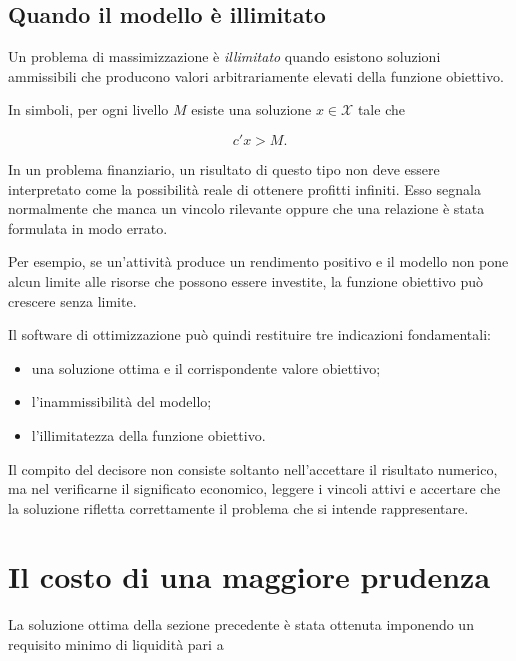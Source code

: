 \subsection{Quando il modello \`e illimitato}

Un problema di massimizzazione \`e \emph{illimitato} quando esistono soluzioni
ammissibili che producono valori arbitrariamente elevati della funzione
obiettivo.

In simboli, per ogni livello $M$ esiste una soluzione $x\in\mathcal{X}$ tale
che

\[
c'x>M.
\]

In un problema finanziario, un risultato di questo tipo non deve essere
interpretato come la possibilit\`a reale di ottenere profitti infiniti. Esso
segnala normalmente che manca un vincolo rilevante oppure che una relazione
\`e stata formulata in modo errato.

Per esempio, se un'attivit\`a produce un rendimento positivo e il modello non
pone alcun limite alle risorse che possono essere investite, la funzione
obiettivo pu\`o crescere senza limite.

Il software di ottimizzazione pu\`o quindi restituire tre indicazioni
fondamentali:

\begin{itemize}

\item una soluzione ottima e il corrispondente valore obiettivo;

\item l'inammissibilit\`a del modello;

\item l'illimitatezza della funzione obiettivo.

\end{itemize}

Il compito del decisore non consiste soltanto nell'accettare il risultato
numerico, ma nel verificarne il significato economico, leggere i vincoli
attivi e accertare che la soluzione rifletta correttamente il problema che si
intende rappresentare.

\section{Il costo di una maggiore prudenza}

\label{sec:cap11-costo-prudenza}

La soluzione ottima della sezione precedente \`e stata ottenuta imponendo un
requisito minimo di liquidit\`a pari a


